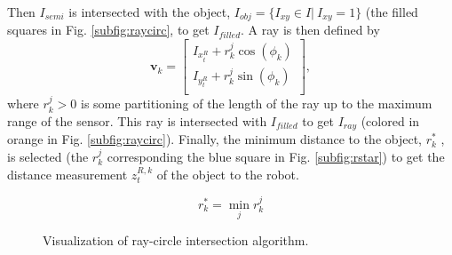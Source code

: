 Then $I_{semi}$ is intersected with the object, $I_{obj}=\{I_{xy}\in I | \ I_{xy}=1\}$ (the filled squares in Fig. \ref{subfig:raycirc}, to get $I_{filled}$.  A ray is then defined by 
\begin{equation}
\textbf{v}_k=\begin{bmatrix}
I_{x_t^R}+r_k^j \cos(\phi_k)\\
I_{y_t^R}+r_k^j \sin(\phi_k)\\
\end{bmatrix}, 
\label{eq:ray}
\end{equation}
where $r_k^j>0$ is some partitioning of the length of the ray up to the maximum range of the sensor.  This ray is intersected with $I_{filled}$ to get $I_{ray}$ (colored in orange in Fig. \ref{subfig:raycirc}).  Finally, the minimum distance to the object, $r_{k}^*$ , is selected (the $r_k^j$ corresponding the blue square in Fig. \ref{subfig:rstar}) to get the distance measurement $z_t^{R,k}$ of the object to the robot.  

\begin{equation}
r_k^*=\min_{j} r_{k}^j
\end{equation}


\begin{figure}[ht]
\centering
{}
\caption{Visualization of ray-circle intersection algorithm.}
\label{fig:raycirc}
\end{figure}

